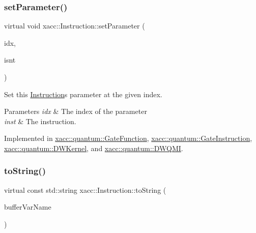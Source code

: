 \mbox{\label{a01155_a407a0ac662fa0b1ec3e301e8ff9bade7}} 
\subsubsection{\texorpdfstring{set\+Parameter()}{setParameter()}}
{\footnotesize\ttfamily virtual void xacc\+::\+Instruction\+::set\+Parameter (\begin{DoxyParamCaption}\item[{const int}]{idx,  }\item[{Instruction\+Parameter \&}]{isnt }\end{DoxyParamCaption})\hspace{0.3cm}{\ttfamily [pure virtual]}}

Set this \hyperlink{a01155}{Instruction}\textquotesingle{}s parameter at the given index.


\begin{DoxyParams}{Parameters}
{\em idx} & The index of the parameter \\
\hline
{\em inst} & The instruction. \\
\hline
\end{DoxyParams}


Implemented in \hyperlink{a01011_ab8d9789b46e92e27a9d7c9c5b7e3683c}{xacc\+::quantum\+::\+Gate\+Function}, \hyperlink{a01015_afb8f7582d7520c77d61b9016753f5669}{xacc\+::quantum\+::\+Gate\+Instruction}, \hyperlink{a00983_adf89cdd1f54e183c4cff36b338b2be8d}{xacc\+::quantum\+::\+D\+W\+Kernel}, and \hyperlink{a00987_a194b5b9f58262774fde0285f4c3f60af}{xacc\+::quantum\+::\+D\+W\+Q\+MI}.

\mbox{\label{a01155_ae94c2d089908294c1d410b14c96817ae}} 
\subsubsection{\texorpdfstring{to\+String()}{toString()}}
{\footnotesize\ttfamily virtual const std\+::string xacc\+::\+Instruction\+::to\+String (\begin{DoxyParamCaption}\item[{const std\+::string \&}]{buffer\+Var\+Name }\end{DoxyParamCaption})\hspace{0.3cm}{\ttfamily [pure virtual]}}

